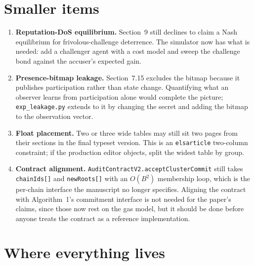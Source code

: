 \documentclass[11pt,a4paper]{article}
\begin{document}
\section{Smaller items}

\begin{enumerate}[leftmargin=*,itemsep=4pt]
  \item \textbf{Reputation-DoS equilibrium.} Section~9 still declines to claim a
  Nash equilibrium for frivolous-challenge deterrence. The simulator now has
  what is needed: add a challenger agent with a cost model and sweep the
  challenge bond against the accuser's expected gain.

  \item \textbf{Presence-bitmap leakage.} Section~7.15 excludes the bitmap
  because it publishes participation rather than state change. Quantifying what
  an observer learns from participation alone would complete the picture;
  \texttt{exp\_leakage.py} extends to it by changing the secret and adding the
  bitmap to the observation vector.

  \item \textbf{Float placement.} Two or three wide tables may still sit two
  pages from their sections in the final typeset version. This is an
  \texttt{elsarticle} two-column constraint; if the production editor objects,
  split the widest table by group.

  \item \textbf{Contract alignment.} \texttt{AuditContractV2.acceptClusterCommit}
  still takes \texttt{chainIds[]} and \texttt{newRoots[]} with an $O(B^2)$
  membership loop, which is the per-chain interface the manuscript no longer
  specifies. Aligning the contract with Algorithm~1's commitment interface is
  not needed for the paper's claims, since those now rest on the gas model, but
  it should be done before anyone treats the contract as a reference
  implementation.
\end{enumerate}

\section*{Where everything lives}
\end{document}
